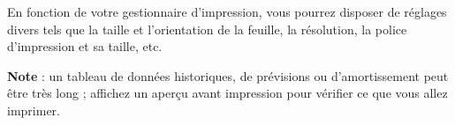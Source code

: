 En fonction de votre gestionnaire d'impression, vous pourrez disposer de réglages divers tels que la taille et l'orientation de la feuille, la résolution, la police d'impression et sa taille, etc.

\textbf{Note} : un tableau de données historiques, de prévisions ou d'amortissement peut être très long ; affichez un aperçu avant impression pour vérifier ce que vous allez imprimer.



